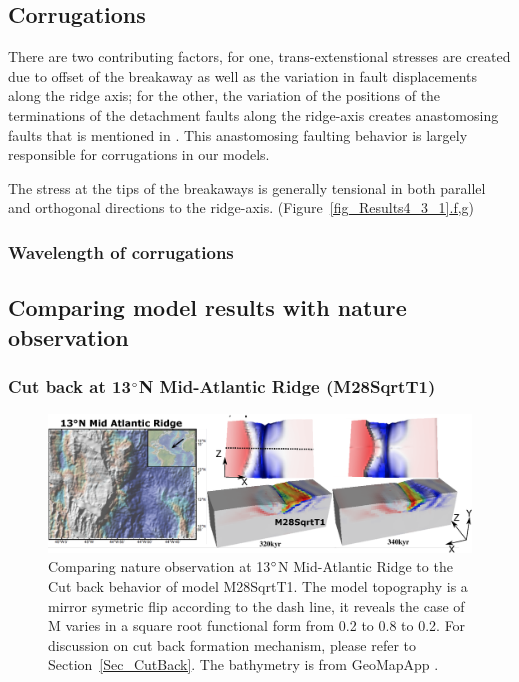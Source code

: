 \subsection{Corrugations}
There are two contributing factors, for one, trans-extenstional stresses are created due to offset of the breakaway as well as the variation in fault displacements along the ridge axis; for the other, the variation of the positions of the terminations of the detachment faults along the ridge-axis creates anastomosing faults that is mentioned in \citep{Smith2014}. This anastomosing faulting behavior is largely responsible for corrugations in our models.      

The stress at the tips of the breakaways is generally tensional in both parallel and orthogonal directions to the ridge-axis. (Figure~\hyperref[fig_Results4_3_1]{\ref{fig_Results4_3_1}.f,g})

\subsubsection{Wavelength of corrugations}



\subsection{Comparing model results with nature observation}

\subsubsection{Cut back at 13$\degree$N Mid-Atlantic Ridge (M28SqrtT1)}

\begin{figure}[h]
 \centering
  \includegraphics[width=1.0\textwidth]{./Figures/fig_Discussion_Observation_1_13N_MAR_CutBack.eps}
 \caption{Comparing nature observation at 13$\degree$N Mid-Atlantic Ridge to the Cut back behavior of model M28SqrtT1. The model topography is a mirror symetric flip according to the dash line, it reveals the case of M varies in a square root functional form from 0.2 to 0.8 to 0.2. For discussion on cut back formation mechanism, please refer to Section~\hyperref[Sec_CutBack]{\ref{Sec_CutBack}}. The bathymetry is from GeoMapApp \citep{Ryan2009}.}
 \label{fig_Discussion_Observation_1}
\end{figure}

